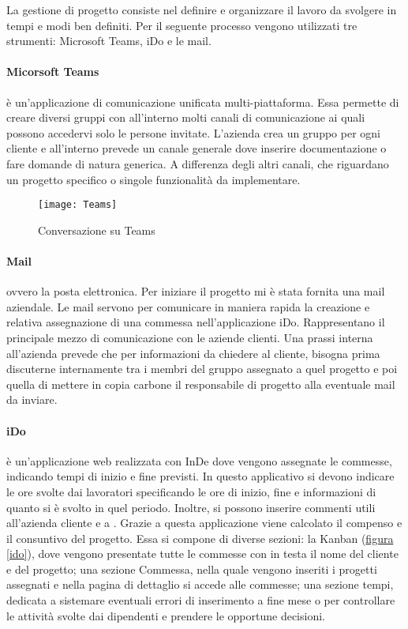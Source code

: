La gestione di progetto consiste nel definire e organizzare il lavoro da svolgere in tempi e modi ben definiti. Per il seguente processo vengono utilizzati tre strumenti: Microsoft Teams, iDo e le mail.

\paragraph{Micorsoft Teams} è un'applicazione di comunicazione unificata multi-piattaforma. Essa permette di creare diversi gruppi con all'interno molti canali di comunicazione ai quali possono accedervi solo le persone invitate. L'azienda crea un gruppo per ogni cliente e all'interno prevede un canale generale dove inserire documentazione o fare domande di natura generica. A differenza degli altri canali, che riguardano un progetto specifico o singole funzionalità da implementare. 

\begin{figure}[!h] 
	\centering 
	\texttt{[image: Teams]} 
	\caption{Conversazione su Teams}
\end{figure}


\paragraph{Mail} ovvero la posta elettronica. Per iniziare il progetto mi è stata fornita una mail aziendale. Le mail servono per comunicare in maniera rapida la creazione e relativa assegnazione di una commessa nell'applicazione iDo. Rappresentano il principale mezzo di comunicazione con le aziende clienti. Una prassi interna all'azienda prevede che per informazioni da chiedere al cliente, bisogna prima discuterne internamente tra i membri del gruppo assegnato a quel progetto e poi quella di mettere in copia carbone il responsabile di progetto alla eventuale mail da inviare.



\paragraph{iDo} è un'applicazione web realizzata con InDe dove vengono assegnate le commesse, indicando tempi di inizio e fine previsti. In questo applicativo si devono indicare le ore svolte dai lavoratori specificando le ore di inizio, fine e informazioni di quanto si è svolto in quel periodo. Inoltre, si possono inserire commenti utili all'azienda cliente e a \azienda. 
Grazie a questa applicazione viene calcolato il compenso e il consuntivo del progetto. Essa si compone di diverse sezioni: la Kanban (\hyperref[ido]{figura \ref{ido}}), dove vengono presentate tutte le commesse con in testa il nome del cliente e del progetto; una sezione Commessa, nella quale vengono inseriti i progetti assegnati e nella pagina di dettaglio si accede alle commesse; una sezione tempi, dedicata a sistemare eventuali errori di inserimento a fine mese o per controllare le attività svolte dai dipendenti e prendere le opportune decisioni.

